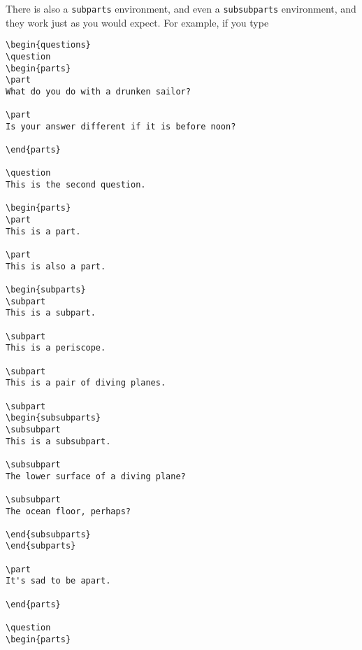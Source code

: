\documentclass[12pt]{exam}
\begin{document}
There is also a \verb"subparts" environment, and even a
\verb"subsubparts" environment, and they work just as you would
expect.  For example, if you type
%
\begin{verbatim}
\begin{questions}
\question
\begin{parts}
\part
What do you do with a drunken sailor?

\part
Is your answer different if it is before noon?
  
\end{parts}

\question
This is the second question.

\begin{parts}
\part
This is a part.

\part
This is also a part.

\begin{subparts}
\subpart
This is a subpart.

\subpart
This is a periscope.

\subpart
This is a pair of diving planes.

\subpart
\begin{subsubparts}
\subsubpart
This is a subsubpart.

\subsubpart
The lower surface of a diving plane?

\subsubpart
The ocean floor, perhaps?

\end{subsubparts}
\end{subparts}

\part
It's sad to be apart.

\end{parts}

\question
\begin{parts}

\end{verbatim}
\end{document}
